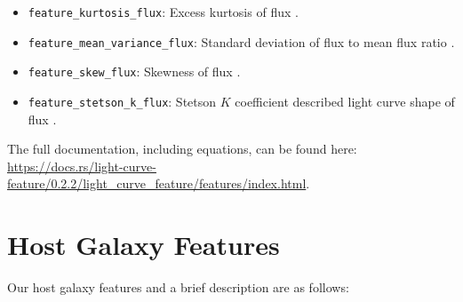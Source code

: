 \documentclass[twocolumn]{aastex63}
\begin{document}
\begin{itemize}
    \item \texttt{feature\_kurtosis\_flux}: Excess kurtosis of flux \citep{Malanchev2021}.
    \item \texttt{feature\_mean\_variance\_flux}: Standard deviation of flux to mean flux ratio \citep{Malanchev2021}.
    \item \texttt{feature\_skew\_flux}: Skewness of flux \citep{Malanchev2021}.
    \item \texttt{feature\_stetson\_k\_flux}: Stetson $K$ coefficient described light curve shape of flux \citep{Stetson1996}.
\end{itemize}


The full documentation, including equations, can be found here: \url{https://docs.rs/light-curve-feature/0.2.2/light_curve_feature/features/index.html}.


\section{Host Galaxy Features}
\label{appx:host_gal_features}


\renewcommand{\thefigure}{A.\arabic{figure}}
\setcounter{figure}{0}
\renewcommand{\thetable}{A.\arabic{table}} \setcounter{table}{0}

Our host galaxy features and a brief description are as follows:
\end{document}
